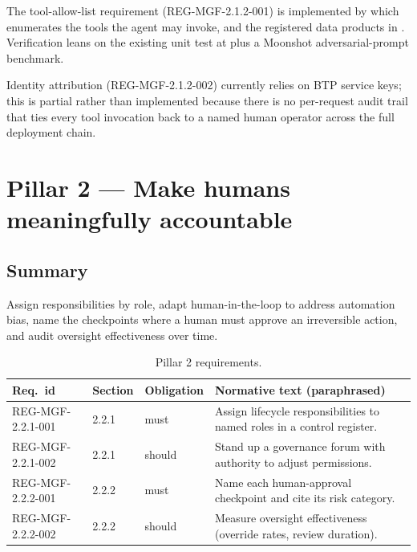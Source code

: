 The tool-allow-list requirement (REG-MGF-2.1.2-001) is implemented by
which enumerates the tools the agent may invoke, and the registered data
products in
.
Verification leans on the existing unit test at
plus a Moonshot adversarial-prompt benchmark.

Identity attribution (REG-MGF-2.1.2-002) currently relies on BTP service
keys; this is partial rather than implemented because there is no
per-request audit trail that ties every tool invocation back to a named
human operator across the full deployment chain.

\section{Pillar 2 --- Make humans meaningfully accountable}
\label{sec:mgf-p2}

\subsection*{Summary}

Assign responsibilities by role, adapt human-in-the-loop to address
automation bias, name the checkpoints where a human must approve an
irreversible action, and audit oversight effectiveness over time.

\begin{table}[h]
\centering
\small
\begin{tabularx}{\textwidth}{p{3.2cm}p{1.4cm}p{1.6cm}X}
\toprule
\textbf{Req.\ id} & \textbf{Section} & \textbf{Obligation} & \textbf{Normative text (paraphrased)} \\
\midrule
REG-MGF-2.2.1-001 & 2.2.1 & must   & Assign lifecycle responsibilities to named roles in a control register. \\
REG-MGF-2.2.1-002 & 2.2.1 & should & Stand up a governance forum with authority to adjust permissions. \\
REG-MGF-2.2.2-001 & 2.2.2 & must   & Name each human-approval checkpoint and cite its risk category. \\
REG-MGF-2.2.2-002 & 2.2.2 & should & Measure oversight effectiveness (override rates, review duration). \\
\bottomrule
\end{tabularx}
\caption{Pillar 2 requirements.}
\label{tab:p2}
\end{table}

